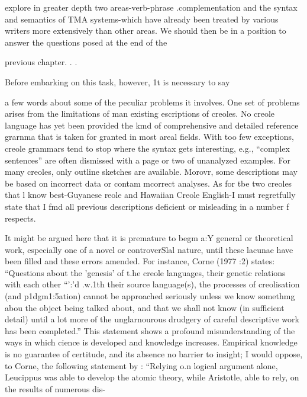 
explore in greater depth two areas-verb-phrase .complementation and the syntax and semantics of TMA systems-which have already been treated by various writers more extensively than other areas. We should then be in a position to answer the questions posed at the end of the

previous chapter. . .

Before embarking on this task, however, 1t is necessary to say

a few words about some of the peculiar problems it involves. One set of problems arises from the limitations of man existing escriptions of creoles. No creole language has yet been provided the kmd of com\-prehensive and detailed reference grarnma that is taken for granted in most areal fields. With too few exceptions, creole grammars tend to stop where the syntax gets interesting, e.g., ``complex sentences'' are often dismissed with a page or two of unanalyzed examples. For many creoles, only outline sketches are available. Morovr, some descriptions may be based on incorrect data or contam mcorrect analyses. As for tbe two creoles that l know best-Guyanese reole and Hawaiian Creole English-I must regretfully state that I fmd all previous descriptions deficient or misleading in a number f respects.

It might be argued here that it is premature to begm a:{\textquotedbl}Y general or theoretical work, especially one of a novel or controverSlal nature, until these lacunae have been filled and these errors amended. For instance, Corne (1977 :2) states: ``Questions about the 'genesis' of t.he creole languages, their genetic relations with each other ``':'d .w.1th their source language(s), the processes of creolisation (and p1dgm1:5a\-tion) cannot be approached seriously unless we know somethmg abou the object being talked about, and that we shall not know (in sufficient detail) until a lot more of the unglarnourous drudgery of careful descriptive work has been completed.'' This statement shows a profound misunderstanding of the ways in which cience is developed and knowledge increases. Empirical knowledge is no guarantee of certitude, and its absence no barrier to insight; I would oppose, to Corne, the following statement by \citet[3]{Dingwall1979}: ``Relying o.n logical argument alone, Leucippus was able to develop the atomic theory, while Aristotle, able to rely, on the results of numerous dis-


